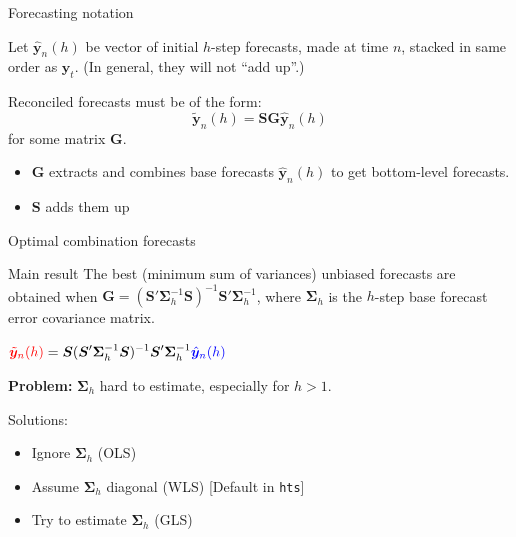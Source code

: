 \documentclass[14pt,ignorenonframetext,]{beamer}
\providecommand{\tightlist}{%
  \setlength{\itemsep}{0pt}\setlength{\parskip}{0pt}}
\def\by{\bm{y}}
\def\bS{\bm{S}}
\def\bSigma{\bm{\Sigma}}
\begin{document}
\begin{frame}{Forecasting notation}
\protect\hypertarget{forecasting-notation}{}

Let \(\hat{\by}_n(h)\) be vector of initial \(h\)-step forecasts, made
at time \(n\), stacked in same order as \(\by_t\). \pause\newline  (In
general, they will not ``add up''.)\pause

\begin{block}{}
Reconciled forecasts must be of the form:
$$\tilde{\by}_{n}(h)=\bS\bm{G}\hat{\by}_{n}(h)$$
for some matrix $\bm{G}$.
\end{block}\pause

\begin{itemize}
\tightlist
\item
  \(\bm{G}\) extracts and combines base forecasts \(\hat{\by}_{n}(h)\)
  to get bottom-level forecasts.
\item
  \(\bS\) adds them up
\end{itemize}

\end{frame}

\begin{frame}[fragile]{Optimal combination forecasts}
\protect\hypertarget{optimal-combination-forecasts}{}

\fontsize{14}{15}\sf

\begin{alertblock}{Main result}
The best (minimum sum of variances) unbiased forecasts are obtained when
$\bm{G} = (\bS'\bSigma^{-1}_{h}\bS)^{-1}\bS'\bSigma^{-1}_{h}$,
where $\bSigma_h$ is the $h$-step base forecast error covariance matrix.
\end{alertblock}

\pause

\begin{block}{}
\centerline{$\displaystyle\textcolor{red}{\tilde{\by}_{n}(h)}
=\bS(\bS'\bSigma^{-1}_{h}\bS)^{-1}\bS'\bSigma^{-1}_{h}\textcolor{blue}{\hat{\by}_{n}(h)}$}
\end{block}\fontsize{14}{15}\sf

\alert{\textbf{Problem:}} \(\bSigma_h\) hard to estimate, especially for
\(h>1\).

\alert{Solutions:}\vspace*{-0.4cm}

\begin{itemize}
\tightlist
\item
  Ignore \(\bSigma_h\) (OLS)
\item
  Assume \(\bSigma_h\) diagonal (WLS) {[}Default in \texttt{hts}{]}
\item
  Try to estimate \(\bSigma_h\) (GLS)
\end{itemize}

\end{frame}
\end{document}
